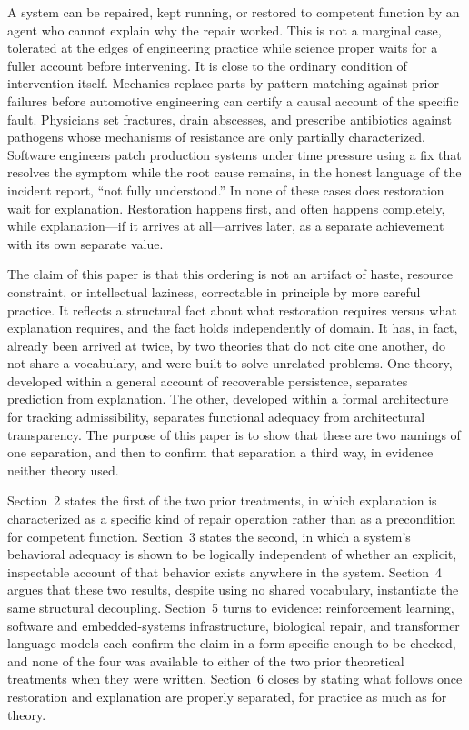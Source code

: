 \documentclass[11pt]{article}
\theoremstyle{plain}
\begin{document}
A system can be repaired, kept running, or restored to competent function by an agent who cannot explain why the repair worked. This is not a marginal case, tolerated at the edges of engineering practice while science proper waits for a fuller account before intervening. It is close to the ordinary condition of intervention itself. Mechanics replace parts by pattern-matching against prior failures before automotive engineering can certify a causal account of the specific fault. Physicians set fractures, drain abscesses, and prescribe antibiotics against pathogens whose mechanisms of resistance are only partially characterized. Software engineers patch production systems under time pressure using a fix that resolves the symptom while the root cause remains, in the honest language of the incident report, ``not fully understood.'' In none of these cases does restoration wait for explanation. Restoration happens first, and often happens completely, while explanation---if it arrives at all---arrives later, as a separate achievement with its own separate value.

The claim of this paper is that this ordering is not an artifact of haste, resource constraint, or intellectual laziness, correctable in principle by more careful practice. It reflects a structural fact about what restoration requires versus what explanation requires, and the fact holds independently of domain. It has, in fact, already been arrived at twice, by two theories that do not cite one another, do not share a vocabulary, and were built to solve unrelated problems. One theory, developed within a general account of recoverable persistence, separates prediction from explanation. The other, developed within a formal architecture for tracking admissibility, separates functional adequacy from architectural transparency. The purpose of this paper is to show that these are two namings of one separation, and then to confirm that separation a third way, in evidence neither theory used.

Section~2 states the first of the two prior treatments, in which explanation is characterized as a specific kind of repair operation rather than as a precondition for competent function. Section~3 states the second, in which a system's behavioral adequacy is shown to be logically independent of whether an explicit, inspectable account of that behavior exists anywhere in the system. Section~4 argues that these two results, despite using no shared vocabulary, instantiate the same structural decoupling. Section~5 turns to evidence: reinforcement learning, software and embedded-systems infrastructure, biological repair, and transformer language models each confirm the claim in a form specific enough to be checked, and none of the four was available to either of the two prior theoretical treatments when they were written. Section~6 closes by stating what follows once restoration and explanation are properly separated, for practice as much as for theory.
\end{document}
